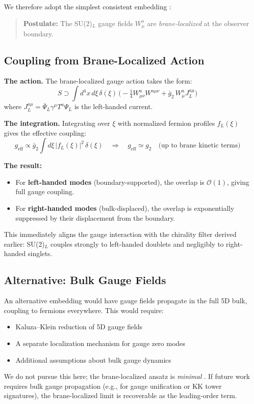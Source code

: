 We therefore adopt the simplest consistent embedding \tagP{}:
\begin{quote}
\textbf{Postulate:} The SU(2)$_L$ gauge fields $W_\mu^a$ are \emph{brane-localized}
at the observer boundary.
\end{quote}

\subsection{Coupling from Brane-Localized Action}

\textbf{The action.} The brane-localized gauge action takes the form:
\begin{equation}
    S \supset \int d^4x\,d\xi\,\delta(\xi)\,\Big(-\tfrac{1}{4} W^a_{\mu\nu}W^{a\mu\nu}
    + \bar{g}_2\,W^a_\mu J_L^{a\mu}\Big)
    \label{eq:ch9_brane_gauge_action}
\end{equation}
where $J_L^{a\mu} = \bar\Psi_L \gamma^\mu T^a \Psi_L$ is the left-handed current.

\textbf{The integration.} Integrating over $\xi$ with normalized fermion profiles
$f_L(\xi)$ gives the effective coupling:
\begin{equation}
    g_{\text{eff}} \propto \bar{g}_2 \int d\xi\,|f_L(\xi)|^2\,\delta(\xi)
    \quad\Rightarrow\quad
    g_{\text{eff}} \simeq g_2 \quad \text{(up to brane kinetic terms)}
    \label{eq:ch9_geff}
\end{equation}

\textbf{The result:}
\begin{itemize}[nosep]
    \item For \textbf{left-handed modes} (boundary-supported), the overlap is
          $\mathcal{O}(1)$, giving full gauge coupling.
    \item For \textbf{right-handed modes} (bulk-displaced), the overlap is
          exponentially suppressed by their displacement from the boundary.
\end{itemize}

This immediately aligns the gauge interaction with the chirality filter derived
earlier: SU(2)$_L$ couples strongly to left-handed doublets and negligibly to
right-handed singlets.

\subsection{Alternative: Bulk Gauge Fields}

An alternative embedding would have gauge fields propagate in the full 5D bulk,
coupling to fermions everywhere. This would require:
\begin{itemize}[nosep]
    \item Kaluza--Klein reduction of 5D gauge fields
    \item A separate localization mechanism for gauge zero modes
    \item Additional assumptions about bulk gauge dynamics
\end{itemize}
We do not pursue this here; the brane-localized ansatz is \emph{minimal} \tagP{}.
If future work requires bulk gauge propagation (e.g., for gauge unification or
KK tower signatures), the brane-localized limit is recoverable as the leading-order term.

